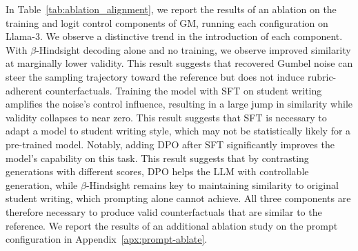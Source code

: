 \documentclass[11pt]{article}
\begin{document}
In Table~\ref{tab:ablation_alignment}, we report the results of an ablation on the training and logit control components of GM, running each configuration on Llama-3. We observe a distinctive trend in the introduction of each component. With $\beta$-Hindsight decoding alone and no training, we observe improved similarity at marginally lower validity. This result suggests that recovered Gumbel noise can steer the sampling trajectory toward the reference but does not induce rubric-adherent counterfactuals. Training the model with SFT on student writing amplifies the noise's control influence, resulting in a large jump in similarity while validity collapses to near zero. This result suggests that SFT is necessary to adapt a model to student writing style, which may not be statistically likely for a pre-trained model. 
Notably, adding DPO after SFT significantly improves the model's capability on this task. This result suggests that by contrasting generations with different scores, DPO helps the LLM with controllable generation, while $\beta$-Hindsight remains key to maintaining similarity to original student writing, which prompting alone cannot achieve. All three components are therefore necessary to produce valid counterfactuals that are similar to the reference. We report the results of an additional ablation study on the prompt configuration in Appendix~\ref{apx:prompt-ablate}. 




\end{document}
